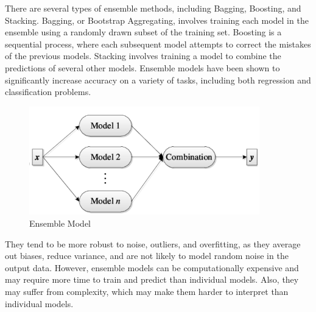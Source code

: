 \documentclass[12pt]{report}
\begin{document}
There are several types of ensemble methods, including Bagging, Boosting, and
Stacking. Bagging, or Bootstrap Aggregating, involves training each model in
the ensemble using a randomly drawn subset of the training set. Boosting is a
sequential process, where each subsequent model attempts to correct the
mistakes of the previous models. Stacking involves training a model to combine
the predictions of several other models\cite{wolpert1992stacked}. Ensemble
models have been shown to significantly increase accuracy on a variety of
tasks, including both regression and classification problems\cite{opitz1999popular}.\newpage
\begin{figure}[ht]
    \centering
    \includegraphics[width=10cm]{./figures/vottingpic.png}
    \caption{Ensemble Model}\label{fig:fig4}
\end{figure}

They tend to be more robust to noise, outliers, and overfitting, as they
average out biases, reduce variance, and are not likely to model random noise
in the output data\cite{zhou2012ensemble}. However, ensemble models can be
computationally expensive and may require more time to train and predict than
individual models. Also, they may suffer from complexity, which may make them
harder to interpret than individual models\cite{rokach2010ensemble}.\newpage
\end{document}
